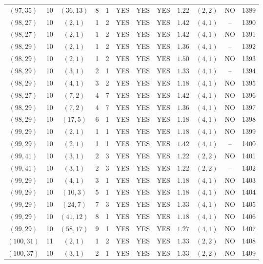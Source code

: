 \begin{longtable}{|c|c|c|c|c|c|c|c|c|c|c|c|}
$(97,35)$ & 10 & $(36,13)$ & 8 & 1 & YES & YES & YES & $1.22$ & $(2,2)$ & NO & 1389\\
$(98,27)$ & 10 & $(2,1)$ & 1 & 2 & YES & YES & YES & $1.42$ & $(4,1)$ & -- & 1390\\
$(98,27)$ & 10 & $(2,1)$ & 1 & 2 & YES & YES & YES & $1.42$ & $(4,1)$ & NO & 1391\\
$(98,29)$ & 10 & $(2,1)$ & 1 & 2 & YES & YES & YES & $1.36$ & $(4,1)$ & -- & 1392\\
$(98,29)$ & 10 & $(2,1)$ & 1 & 2 & YES & YES & YES & $1.50$ & $(4,1)$ & NO & 1393\\
$(98,29)$ & 10 & $(3,1)$ & 2 & 1 & YES & YES & YES & $1.33$ & $(4,1)$ & -- & 1394\\
$(98,29)$ & 10 & $(4,1)$ & 3 & 2 & YES & YES & YES & $1.18$ & $(4,1)$ & NO & 1395\\
$(98,27)$ & 10 & $(7,2)$ & 4 & 7 & YES & YES & YES & $1.42$ & $(4,1)$ & NO & 1396\\
$(98,29)$ & 10 & $(7,2)$ & 4 & 7 & YES & YES & YES & $1.36$ & $(4,1)$ & NO & 1397\\
$(98,29)$ & 10 & $(17,5)$ & 6 & 1 & YES & YES & YES & $1.18$ & $(4,1)$ & NO & 1398\\
$(99,29)$ & 10 & $(2,1)$ & 1 & 1 & YES & YES & YES & $1.18$ & $(4,1)$ & NO & 1399\\
$(99,29)$ & 10 & $(2,1)$ & 1 & 1 & YES & YES & YES & $1.42$ & $(4,1)$ & -- & 1400\\
$(99,41)$ & 10 & $(3,1)$ & 2 & 3 & YES & YES & YES & $1.22$ & $(2,2)$ & NO & 1401\\
$(99,41)$ & 10 & $(3,1)$ & 2 & 3 & YES & YES & YES & $1.22$ & $(2,2)$ & -- & 1402\\
$(99,29)$ & 10 & $(4,1)$ & 3 & 1 & YES & YES & YES & $1.18$ & $(4,1)$ & NO & 1403\\
$(99,29)$ & 10 & $(10,3)$ & 5 & 1 & YES & YES & YES & $1.18$ & $(4,1)$ & NO & 1404\\
$(99,29)$ & 10 & $(24,7)$ & 7 & 3 & YES & YES & YES & $1.33$ & $(4,1)$ & NO & 1405\\
$(99,29)$ & 10 & $(41,12)$ & 8 & 1 & YES & YES & YES & $1.18$ & $(4,1)$ & NO & 1406\\
$(99,29)$ & 10 & $(58,17)$ & 9 & 1 & YES & YES & YES & $1.27$ & $(4,1)$ & NO & 1407\\
$(100,31)$ & 11 & $(2,1)$ & 1 & 2 & YES & YES & YES & $1.33$ & $(2,2)$ & NO & 1408\\
$(100,37)$ & 10 & $(3,1)$ & 2 & 1 & YES & YES & YES & $1.33$ & $(2,2)$ & NO & 1409\\

\end{longtable}

